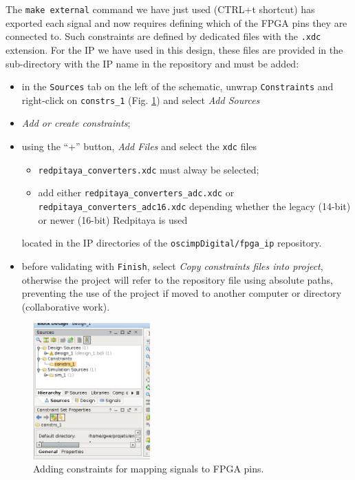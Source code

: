 \documentclass[10pt,oneside]{article}
\begin{document}
The {\tt make external} command we have just used (CTRL+t shortcut) has exported
each signal and now requires defining which of the FPGA pins they are connected to.
Such constraints are defined by dedicated files with the {\tt .xdc} extension. For the
IP we have used in this design, these files are provided in the sub-directory with the
IP name in the repository and must be added:
\begin{itemize}
\item in the {\tt Sources} tab on the left of the schematic, unwrap {\tt Constraints} 
and right-click on {\tt constrs\_1} (Fig. \ref{addSources}) and select {\em Add Sources}
\item {\em Add or create constraints};
\item using the ``+'' button, {\em Add Files} and select the {\tt xdc} files
	\begin{itemize}
\item {\tt redpitaya\_converters.xdc} must alway be selected;
\item add either {\tt redpitaya\_converters\_adc.xdc} or {\tt redpitaya\_converters\_adc16.xdc} 
depending whether the legacy (14-bit) or newer (16-bit) Redpitaya is used 
	\end{itemize}
located in the IP directories of the {\tt oscimpDigital/fpga\_ip} repository.
\item before validating with {\tt Finish}, select {\em Copy constraints
files into project}, otherwise the project will refer to the repository file
using absolute paths, preventing the use of the project if moved to another
computer or directory (collaborative work).
\end{itemize}

\begin{figure}[h!tb]
\begin{center}
\includegraphics[width=0.4\textwidth]{addSources}
\end{center}
\caption{Adding constraints for mapping signals to FPGA pins.}
\label{addSources}
\end{figure}
\end{document}
